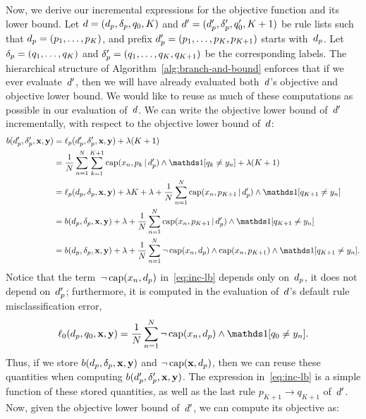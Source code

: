 Now, we derive our incremental expressions for the objective function and its lower bound.
%
Let ${{d} = (d_p, \delta_p, q_0, K)}$ and
${{d}' = (d_p', \delta_p', q_0', K + 1)}$
be rule lists such that ${d_p = (p_1, \dots, p_K)}$,
and prefix ${d_p' = (p_1, \dots, p_K, p_{K+1})}$ starts with~$d_p$.
%
Let ${\delta_p = (q_1, \dots, q_K)}$ and
${\delta_p' = (q_1, \dots, q_K, q_{K+1})}$ be the corresponding labels.
%
The hierarchical structure of Algorithm~\ref{alg:branch-and-bound}
enforces that if we ever evaluate~${d}'$, then we will have already
evaluated both~${d}$'s objective and objective lower bound.
%
We would like to reuse as much of these computations as possible
in our evaluation of~${d}$.
%
We can write the objective lower bound of~${d}'$ incrementally,
with respect to the objective lower bound of~${d}$:
\begin{align}
b(\Prefix', \Labels', \x, \y)
  &= \Loss_p(\Prefix', \Labels', \x, \y) + \Reg (K + 1) \nn \\
&= \frac{1}{N} \sum_{n=1}^N \sum_{k=1}^{K+1} \Cap(x_n, p_k \given \Prefix')
  \wedge \one [ q_k \neq y_n ] + \Reg (K+1) \nn \\
&= \Loss_p(\Prefix, \Labels, \x, \y) + \Reg K + \Reg
  + \frac{1}{N} \sum_{n=1}^N \Cap(x_n, p_{K+1} \given \Prefix') \wedge \one [q_{K+1} \neq y_n ] \nn \\
&= b(\Prefix, \Labels, \x, \y) + \Reg
  + \frac{1}{N} \sum_{n=1}^N \Cap(x_n, p_{K+1} \given \Prefix') \wedge \one [q_{K+1} \neq y_n ] \nn \\
&= b(\Prefix, \Labels, \x, \y) + \Reg  + \frac{1}{N} \sum_{n=1}^N \neg\, \Cap(x_n, \Prefix) \wedge
  \Cap(x_n, p_{K+1}) \wedge \one [q_{K+1} \neq y_n].
\label{eq:inc-lb}
\end{align}
Notice that the term~${\neg\, \textnormal{cap}(x_n, d_p)}$ in~\eqref{eq:inc-lb}
depends only on~$d_p$, \ie it does not depend on~$d_p'$; furthermore,
it is computed in the evaluation of~${d}$'s default rule misclassification error,
\begin{align}
\Loss_0(\Prefix, \Default, \x, \y) = \frac{1}{N}\sum_{n=1}^N \neg\, \Cap(x_n, \Prefix) \wedge \one [q_0 \neq y_n].
\end{align}
Thus, if we store $b(d_p, \delta_p, \mathbf{x}, \mathbf{y})$ and ${\neg\, \textnormal{cap}(\mathbf{x}, d_p)}$,
then we can reuse these quantities when computing $b(d_p', \delta_p', \mathbf{x}, \mathbf{y})$.
%
The expression in~\eqref{eq:inc-lb} is a simple function of these stored quantities,
as well as the last rule ${p_{K+1} \rightarrow q_{K+1}}$ of~${d}'$.
%
Now, given the objective lower bound of~${d}'$, we can compute its objective as:
